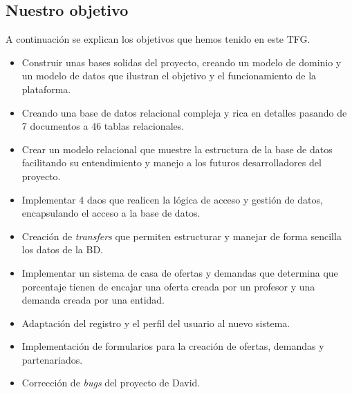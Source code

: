 \documentclass[11pt]{article}
\begin{document}
\subsection{Nuestro objetivo}
A continuación se explican los objetivos que hemos tenido en este TFG.
\begin{itemize} 
	\item Construir unas bases solidas del proyecto, creando un modelo de dominio y un modelo de datos que ilustran el objetivo y el funcionamiento de la plataforma.
	\item Creando una base de datos relacional compleja y rica en detalles pasando de 7 documentos a 46 tablas relacionales.
	\item Crear un modelo relacional que muestre la estructura de la base de datos facilitando su entendimiento y manejo a los futuros desarrolladores del proyecto.
	\item Implementar 4 daos que realicen la lógica de acceso y gestión de datos, encapsulando el acceso a la base de datos.
	\item Creación de \textit{transfers} que permiten estructurar y manejar de forma sencilla los datos de la BD.
	\item Implementar un sistema de casa de ofertas y demandas que determina que porcentaje tienen de encajar una oferta creada por un profesor y una demanda creada por una entidad.
	\item Adaptación del registro y el perfil del usuario al nuevo sistema.
	\item Implementación de formularios para la creación de ofertas, demandas y partenariados.
	\item Corrección de \textit{bugs} del proyecto de David.
\end{itemize}
 
\end{document}

